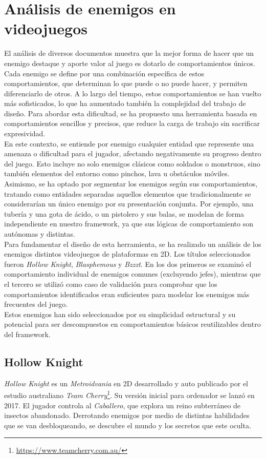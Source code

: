 \section{Análisis de enemigos en videojuegos}
El análisis de diversos documentos muestra que la mejor forma de hacer que un enemigo destaque y aporte valor al juego es dotarlo de comportamientos únicos. Cada enemigo se define por una combinación específica de estos comportamientos, que determinan lo que puede o no puede hacer, y permiten diferenciarlo de otros. A lo largo del tiempo, estos comportamientos se han vuelto más sofisticados, lo que ha aumentado también la complejidad del trabajo de diseño. Para abordar esta dificultad, se ha propuesto una herramienta basada en comportamientos sencillos y precisos, que reduce la carga de trabajo sin sacrificar expresividad.\\

En este contexto, se entiende por enemigo cualquier entidad que represente una amenaza o dificultad para el jugador, afectando negativamente su progreso dentro del juego. Esto incluye no solo enemigos clásicos como soldados o monstruos, sino también elementos del entorno como pinchos, lava u obstáculos móviles. Asimismo, se ha optado por segmentar los enemigos según sus comportamientos, tratando como entidades separadas aquellos elementos que tradicionalmente se considerarían un único enemigo por su presentación conjunta. Por ejemplo, una tubería y una gota de ácido, o un pistolero y sus balas, se modelan de forma independiente en nuestro framework, ya que sus lógicas de comportamiento son autónomas y distintas.\\

Para fundamentar el diseño de esta herramienta, se ha realizado un análisis de los enemigos distintos videojuegos de plataformas en 2D. Los títulos seleccionados fueron \textit{Hollow Knight}, \textit{Blasphemous} y \textit{Bzzzt}. En los dos primeros se examinó el comportamiento individual de enemigos comunes (excluyendo jefes), mientras que el tercero se utilizó como caso de validación para comprobar que los comportamientos identificados eran suficientes para modelar los enemigos más frecuentes del juego.\\

Estos enemigos han sido seleccionados por su simplicidad estructural y su potencial para ser descompuestos en comportamientos básicos reutilizables dentro del framework.
\subsection{Hollow Knight}
\textit{Hollow Knight} es un \emph{Metroidvania} en 2D desarrollado y auto publicado por el estudio australiano \emph{Team Cherry}\footnote{\url{https://www.teamcherry.com.au/}}. Su versión inicial para ordenador se lanzó en 2017. El jugador controla al \textit{Caballero}, que explora un reino subterráneo de insectos abandonado. Derrotando enemigos por medio de distintas habilidades que se van desbloqueando, se descubre el mundo y los secretos que este oculta.\\

